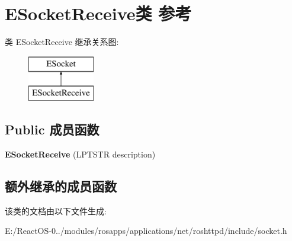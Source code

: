 \hypertarget{class_e_socket_receive}{}\section{E\+Socket\+Receive类 参考}
\label{class_e_socket_receive}
类 E\+Socket\+Receive 继承关系图\+:\begin{figure}[H]
\begin{center}
\leavevmode
\includegraphics[height=2.000000cm]{class_e_socket_receive}
\end{center}
\end{figure}
\subsection*{Public 成员函数}
\begin{DoxyCompactItemize}
\item 
\mbox{\label{class_e_socket_receive_a58fe5df4b7fd0ed256f53c0098849aa9}} 
{\bfseries E\+Socket\+Receive} (L\+P\+T\+S\+TR description)
\end{DoxyCompactItemize}
\subsection*{额外继承的成员函数}


该类的文档由以下文件生成\+:\begin{DoxyCompactItemize}
\item 
E\+:/\+React\+O\+S-\/0../modules/rosapps/applications/net/roshttpd/include/socket.\+h\end{DoxyCompactItemize}
